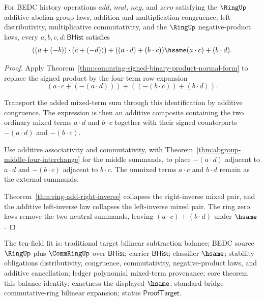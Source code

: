 \begin{theorem}
\label{thm:commring-signed-product-balance}
For BEDC history operations $add$, $mul$, $neg$, and $zero$ satisfying the
$\RingUp$ additive abelian-group laws, addition and multiplication
congruence, left distributivity, multiplicative commutativity, and the
$\RingUp$ negative-product laws, every $a,b,c,d : \mathsf{BHist}$ satisfies
$$
((a+(-b))\cdot(c+(-d)))+((a\cdot d)+(b\cdot c))
\hsame
(a\cdot c)+(b\cdot d).
$$
\end{theorem}
\begin{proof}
Apply Theorem~\ref{thm:commring-signed-binary-product-normal-form} to replace
the signed product by the four-term row expansion
$$
(a\cdot c+(-(a\cdot d)))+((-(b\cdot c))+(b\cdot d)).
$$

Transport the added mixed-term sum through this identification by additive
congruence. The expression is then an additive composite containing the two
ordinary mixed terms $a\cdot d$ and $b\cdot c$ together with their signed
counterparts $-(a\cdot d)$ and $-(b\cdot c)$.

Use additive associativity and commutativity, with
Theorem~\ref{thm:abgroup-middle-four-interchange} for the middle summands, to
place $-(a\cdot d)$ adjacent to $a\cdot d$ and $-(b\cdot c)$ adjacent to
$b\cdot c$. The unmixed terms $a\cdot c$ and $b\cdot d$ remain as the
external summands.

Theorem~\ref{thm:ring-add-right-inverse} collapses the right-inverse mixed
pair, and the additive left-inverse law collapses the left-inverse mixed
pair. The ring zero laws remove the two neutral summands, leaving
$(a\cdot c)+(b\cdot d)$ under $\hsame$.
\end{proof}

The ten-field fit is: traditional target bilinear subtraction balance; BEDC
source $\RingUp$ plus $\CommRingUp$ over $\mathsf{BHist}$; carrier
$\mathsf{BHist}$; classifier $\hsame$; stability obligations distributivity,
congruence, commutativity, negative-product laws, and additive cancellation;
ledger polynomial mixed-term provenance; core theorem this balance identity;
exactness the displayed $\hsame$; standard bridge commutative-ring bilinear
expansion; status $\mathsf{ProofTarget}$.

